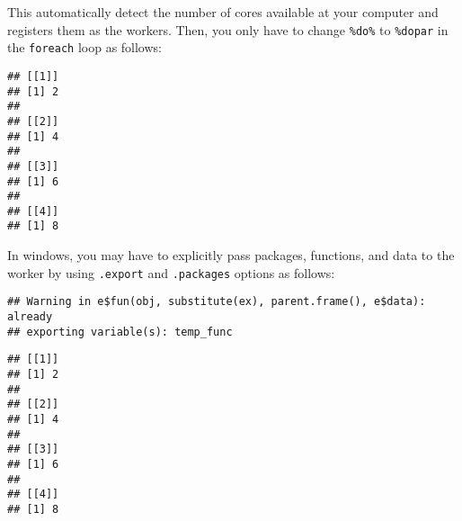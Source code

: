 \documentclass[
]{book}
\newenvironment{Shaded}{\begin{snugshade}}{\end{snugshade}}
\newcommand{\CommentTok}[1]{\textcolor[rgb]{0.56,0.35,0.01}{\textit{#1}}}
\newcommand{\ControlFlowTok}[1]{\textcolor[rgb]{0.13,0.29,0.53}{\textbf{#1}}}
\newcommand{\DataTypeTok}[1]{\textcolor[rgb]{0.13,0.29,0.53}{#1}}
\newcommand{\DecValTok}[1]{\textcolor[rgb]{0.00,0.00,0.81}{#1}}
\newcommand{\KeywordTok}[1]{\textcolor[rgb]{0.13,0.29,0.53}{\textbf{#1}}}
\newcommand{\NormalTok}[1]{#1}
\newcommand{\OperatorTok}[1]{\textcolor[rgb]{0.81,0.36,0.00}{\textbf{#1}}}
\newcommand{\StringTok}[1]{\textcolor[rgb]{0.31,0.60,0.02}{#1}}
\begin{document}
This automatically detect the number of cores available at your computer and registers them as the workers. Then, you only have to change \texttt{\%do\%} to \texttt{\%dopar} in the \texttt{foreach} loop as follows:

\begin{Shaded}
\end{Shaded}

\begin{verbatim}
## [[1]]
## [1] 2
## 
## [[2]]
## [1] 4
## 
## [[3]]
## [1] 6
## 
## [[4]]
## [1] 8
\end{verbatim}

In windows, you may have to explicitly pass packages, functions, and data to the worker by using \texttt{.export} and \texttt{.packages} options as follows:

\begin{Shaded}
\end{Shaded}

\begin{verbatim}
## Warning in e$fun(obj, substitute(ex), parent.frame(), e$data): already
## exporting variable(s): temp_func
\end{verbatim}

\begin{verbatim}
## [[1]]
## [1] 2
## 
## [[2]]
## [1] 4
## 
## [[3]]
## [1] 6
## 
## [[4]]
## [1] 8
\end{verbatim}
\end{document}
